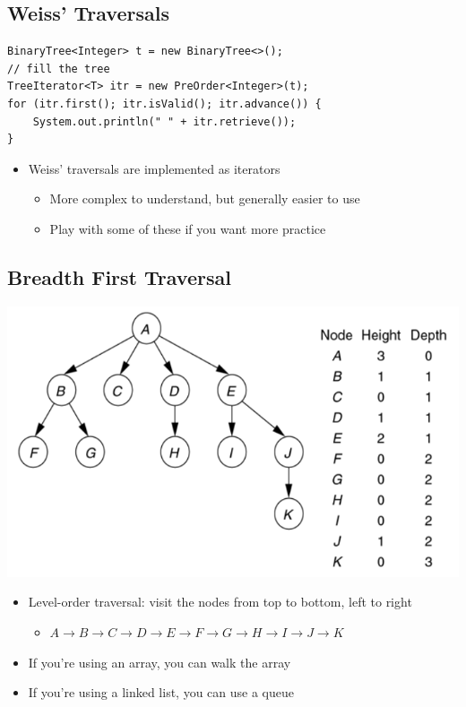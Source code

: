 \documentclass[10pt]{article}
\begin{document}
\subsection*{Weiss' Traversals}
\begin{verbatim}
BinaryTree<Integer> t = new BinaryTree<>();
// fill the tree
TreeIterator<T> itr = new PreOrder<Integer>(t);
for (itr.first(); itr.isValid(); itr.advance()) {
    System.out.println(" " + itr.retrieve());
}
\end{verbatim}
\begin{itemize}
    \item Weiss' traversals are implemented as iterators
    \begin{itemize}
        \item More complex to understand, but generally easier to use
        \item Play with some of these if you want more practice
    \end{itemize}
\end{itemize}

\subsection*{Breadth First Traversal}
\begin{center}
    \includegraphics[width=0.5\linewidth]{images/6.png}
\end{center}
\begin{itemize}
    \item Level-order traversal: visit the nodes from top to bottom, left to right
    \begin{itemize}
        \item $A \to B \to C \to D \to E \to F \to G \to H \to I \to J \to K$
    \end{itemize}
    \item If you're using an array, you can walk the array
    \item If you're using a linked list, you can use a queue
\end{itemize}
\end{document}
